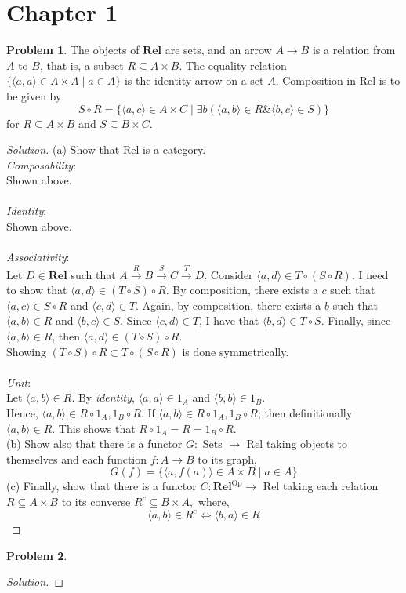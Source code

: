 \documentclass[fontsize=14pt]{scrartcl}
\theoremstyle{definition}
\newtheorem{problem-internal}{Problem}[section]
\newenvironment{problem}{
\medskip
\begin{problem-internal}
}{
\end{problem-internal}
}
\newenvironment{solution}{
\begin{proof}[Solution]
\vspace{-8px}
\setlength{\parskip}{4px}
\setlength{\parindent}{0px}
}{
\end{proof}
}
\begin{document}
\section*{Chapter 1}

\setcounter{section}{9}
\setcounter{problem-internal}{0}
\begin{problem}
    The objects of $\mathbf{R e l}$ are sets, and an arrow $A \rightarrow B$ is a relation from $A$ to $B$, that is, a subset $R \subseteq A \times B .$ The equality relation $\{\langle a, a\rangle \in A \times A \mid a \in A\}$ is the identity arrow on a set $A .$ Composition in Rel is to be given by
    $$
    S \circ R=\{\langle a, c\rangle \in A \times C \mid \exists b(\langle a, b\rangle \in R \&\langle b, c\rangle \in S)\}
    $$
    for $R \subseteq A \times B$ and $S \subseteq B \times C$.
\end{problem}
\begin{solution}
(a) Show that Rel is a category.\\
\textit{Composability}:\\
Shown above.\\\\
\textit{Identity}:\\
Shown above.\\\\
\textit{Associativity}:\\
Let $D\in\mathbf{Rel}$ such that $A\xrightarrow{R} B \xrightarrow{S} C\xrightarrow{T} D$. Consider $\langle a,d\rangle\in T\circ(S\circ R)$. 
I need to show that $\langle a,d\rangle\in(T\circ S)\circ R$.
By composition, there exists a $c$ such that $\langle a,c\rangle\in S\circ R$ and
$\langle c,d\rangle\in T$. Again, by composition, 
there exists a $b$ such that $\langle a,b\rangle\in R$ and $\langle b,c\rangle\in S$.
Since $\langle c,d\rangle\in T$, I have that $\langle b,d\rangle\in T\circ S$.
Finally, since $\langle a,b\rangle\in R$, then $\langle a,d\rangle\in(T\circ S)\circ R$.\\
Showing $(T\circ S)\circ R\subset T\circ(S\circ R)$ is done symmetrically.\\
\\
\textit{Unit}:\\
Let $\langle a,b\rangle\in R$. By \textit{identity}, $\langle a,a\rangle\in 1_A$ and $\langle b,b\rangle\in 1_B$. \\
Hence, $\langle a,b\rangle\in R\circ 1_A, 1_B\circ R$. If $\langle a,b\rangle\in R\circ 1_A, 1_B\circ R$; then definitionally $\langle a,b\rangle\in R$.
This shows that $R\circ 1_A=R=1_B\circ R$.\\

(b) Show also that there is a functor $G:$ Sets $\rightarrow$ Rel taking objects to themselves and each function $f: A \rightarrow B$ to its graph,
$$
G(f)=\{\langle a, f(a)\rangle \in A \times B \mid a \in A\}
$$
(c) Finally, show that there is a functor $C: \mathbf{R e l}^{\mathrm{Op}} \rightarrow$ Rel taking each relation $R \subseteq A \times B$ to its converse $R^{c} \subseteq B \times A,$ where,
$$
\langle a, b\rangle \in R^{c} \Leftrightarrow\langle b, a\rangle \in R
$$

\end{solution}

\setcounter{section}{9}
\setcounter{problem-internal}{1}
\begin{problem}

\end{problem}
\begin{solution}

\end{solution}
\end{document}
